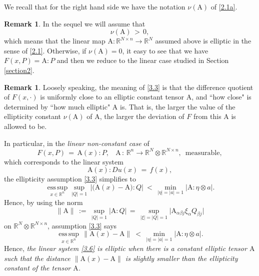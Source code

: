 \documentclass{amsart}
\theoremstyle{definition}
\newtheorem{remark}[theorem]{Remark}
\numberwithin{equation}{section}
\begin{document}
{\medskip}
{\noindent} We recall that for the right hand side we have the notation $\nu({\textrm{A}})$ of \eqref{2.1a}.

\begin{remark} In the sequel we will assume that 
\[
\nu({\textrm{A}})\, >\, 0, 
\]
which means that the linear map ${\textrm{A}} : {\mathbb{R}}^{N{\times} n}{\longrightarrow} {\mathbb{R}}^N$ assumed above is elliptic in the sense of \eqref{2.1}. Otherwise, if $\nu({\textrm{A}})=0$, it easy to see that we have $F(x,P)={\textrm{A}}:P$ and then we reduce to the linear case studied in Section \ref{section2}. 
\end{remark}

\begin{remark} Loosely speaking, the meaning of \eqref{3.3} is that the difference quotient of $F(x,\cdot)$ is uniformly close to an elliptic constant tensor ${\textrm{A}}$, and ``how close" is determined by ``how much elliptic" ${\textrm{A}}$ is. That is, the larger the value of the ellipticity constant $\nu({\textrm{A}})$ of ${\textrm{A}}$, the larger the deviation of $F$ from this ${\textrm{A}}$ is allowed to be. 

In particular, in the \emph{linear non-constant case} of 
\[
F(x,P)\, =\, {\textrm{A}}(x):P, \ \ \ \ {\textrm{A}} \, :\, {\mathbb{R}}^n {\longrightarrow} {\mathbb{R}}^N {\otimes} {\mathbb{R}}^{N{\times} n}, \, \text{ measurable},
\]
which corresponds to the linear system
\begin{equation} \label{3.6}
{\textrm{A}}(x): Du(x)\, =\, f(x),
\end{equation}
the ellipticity assumption \eqref{3.3} simplifies to
\begin{equation} \label{3.5}
\underset{x\in {\mathbb{R}}^n}{{\textrm{ess}}\,\sup} \sup_{|Q|=1}\,\left| \big({\textrm{A}}(x)-{\textrm{A}} \big):Q\right| \ <\, \min_{|\eta|=|a|=1}\big| {\textrm{A}}:\eta {\otimes} a \big|.
\end{equation}
Hence, by using the norm 
\[
\|{\textrm{A}}\|\, :=\, \sup_{|Q|=1}|{\textrm{A}}:Q| \, =\, \sup_{|\xi|=|Q|=1}\big|{\textrm{A}}_{{\alpha} {\beta} j} \xi_{\alpha}  Q_{{\beta} j} \big| 
\]
on ${\mathbb{R}}^N {\otimes} {\mathbb{R}}^{N{\times} n}$, assumption  \eqref{3.3} says
\begin{equation} \label{3.7}
\underset{x\in {\mathbb{R}}^n}{{\textrm{ess}}\,\sup}\, \big\| {\textrm{A}}(x)-{\textrm{A}} \big\| \ <\, \min_{|\eta|=|a|=1}\big| {\textrm{A}}:\eta {\otimes} a \big|.
\end{equation}
Hence, \emph{the linear system \eqref{3.6} is elliptic when there is a constant elliptic tensor ${\textrm{A}}$ such that the distance $\|{\textrm{A}}(x)-{\textrm{A}}\|$ is slightly smaller than the ellipticity constant of the tensor ${\textrm{A}}$.}
\end{remark}
\end{document}
